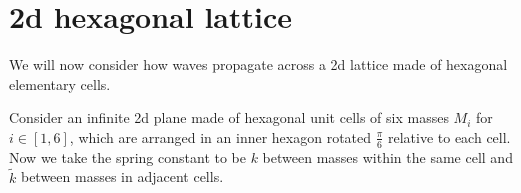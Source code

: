 \section{2d hexagonal lattice}
We will now consider how waves propagate across a 2d lattice made of hexagonal elementary cells. 

Consider an infinite 2d plane made of hexagonal unit cells of six masses $M_i$
for $i\in\left[1,6\right]$, which are arranged in an inner hexagon rotated
$\frac{\pi}{6}$ relative to each cell. Now we take the spring constant to be $k$
between masses within the same cell and $\tilde{k}$ between masses in adjacent
cells.


